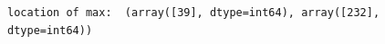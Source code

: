 \documentclass[11pt]{article}
\begin{document}
    \begin{Verbatim}[commandchars=\\\{\}]
location of max:  (array([39], dtype=int64), array([232], dtype=int64))

    \end{Verbatim}

    \begin{center}
    \end{center}
    { \hspace*{\fill} \\}
    

    
    
    
    
\end{document}
